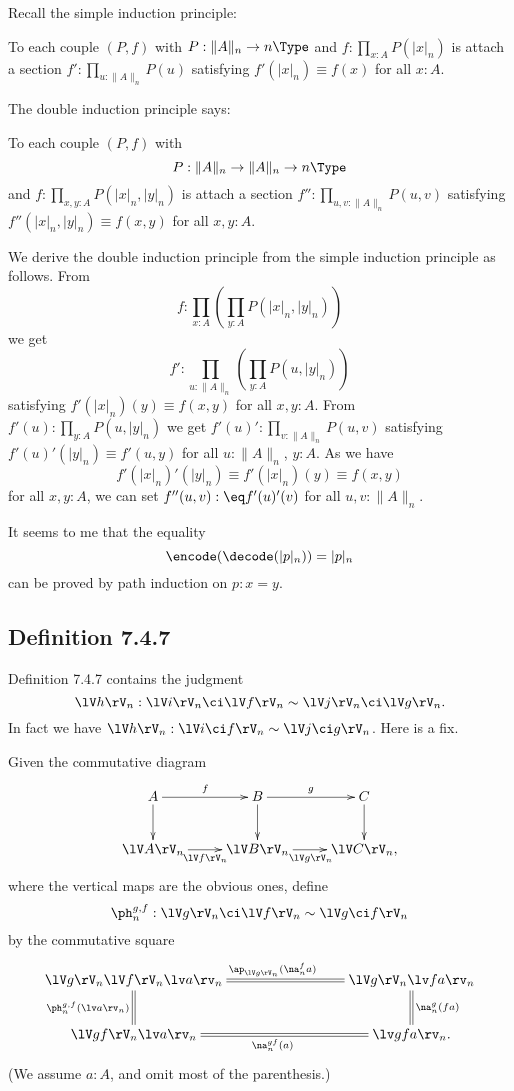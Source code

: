\documentclass[12pt]{article}
\begin{document}
Recall the simple induction principle:

To each couple $(P,f)$ with $P:\lVert A\rVert_n\to n\Type$ and $f:\prod_{x:A}P(\lvert x\rvert_n)$ is attach a section $f':\prod_{u:\lVert A\rVert_n}P(u)$ satisfying $f'(\lvert x\rvert_n)\equiv f(x)$ for all $x:A$.

The double induction principle says:

To each couple $(P,f)$ with $$P:\lVert A\rVert_n\to\lVert A\rVert_n\to n\Type$$ and $f:\prod_{x,y:A}P(\lvert x\rvert_n,\lvert y\rvert_n)$ is attach a section $f'':\prod_{u,v:\lVert A\rVert_n}P(u,v)$ satisfying $f''(\lvert x\rvert_n,\lvert y\rvert_n)\equiv f(x,y)$ for all $x,y:A$.

We derive the double induction principle from the simple induction principle as follows. From 
$$
f:\prod_{x:A}\left(\prod_{y:A}P(\lvert x\rvert_n,\lvert y\rvert_n)\right)
$$ 
we get 
$$
f':\prod_{u:\lVert A\rVert_n}\left(\prod_{y:A}P(u,\lvert y\rvert_n)\right)
$$ 
satisfying $f'(\lvert x\rvert_n)(y)\equiv f(x,y)$ for all $x,y:A$. From $f'(u):\prod_{y:A}P(u,\lvert y\rvert_n)$ we get $f'(u)':\prod_{v:\lVert A\rVert_n}P(u,v)$ satisfying $f'(u)'(\lvert y\rvert_n)\equiv f'(u,y)$ for all $u:\lVert A\rVert_n$, $y:A$. As we have 
$$
f'(\lvert x\rvert_n)'(\lvert y\rvert_n)\equiv f'(\lvert x\rvert_n)(y)\equiv f(x,y) 
$$ 
for all $x,y:A$, we can set $f''(u,v):\eq f'(u)'(v)$ for all $u,v:\lVert A\rVert_n$. 

It seems to me that the equality 
$$
\encode(\decode(\lvert p\rvert_n))=\lvert p\rvert_n
$$ 
can be proved by path induction on $p:x=y$.


\subsection{Definition 7.4.7}\label{747}

Definition 7.4.7 contains the judgment 
$$
\lV h\rV_n:\lV i\rV_n\ci\lV f\rV_n\sim\lV j\rV_n\ci\lV g\rV_n.
$$ 
In fact we have $\lV h\rV_n:\lV i\ci f\rV_n\sim\lV j\ci g\rV_n$. Here is a fix. 

Given the commutative diagram
$$
\xymatrix{
A\ar[r]^f\ar[d]&B\ar[r]^g\ar[d]&C\ar[d]\\
\lV A\rV_n\ar[r]_{\lV f\rV_n}&\lV B\rV_n\ar[r]_{\lV g\rV_n}&\lV C\rV_n,}
$$ 
where the vertical maps are the obvious ones, define 
$$
\ph_n^{g,f}:\lV g\rV_n\ci\lV f\rV_n\sim\lV g\ci f\rV_n
$$ 
by the commutative square 
$$
\xymatrix{
\lV g\rV_n\lV f\rV_n\lv a\rv_n\ar@{=}[d]_{\ph_n^{g,f}(\lv a\rv_n)}\ar@{=}[rrr]^{\ap_{\lV g\rV_n}(\na_n^fa)}&&&
\lV g\rV_n\lv fa\rv_n\ar@{=}[d]^{\na_n^g(fa)}\\
\lV gf\rV_n\lv a\rv_n\ar@{=}[rrr]_{\na_n^{gf}(a)}&&&\lv gfa\rv_n.}
$$ 
(We assume $a:A$, and omit most of the parenthesis.)
\end{document}
